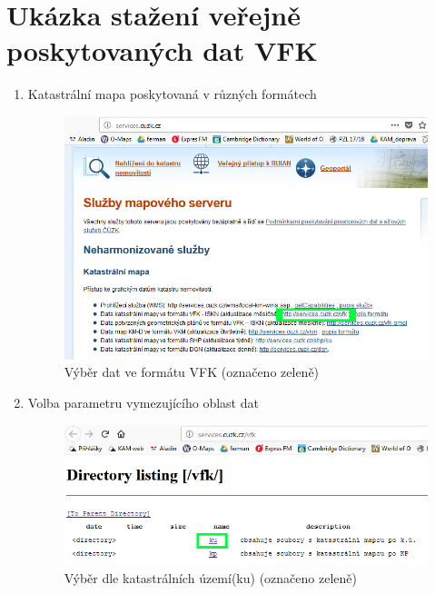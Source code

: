  \section{Ukázka stažení veřejně poskytovaných dat VFK}
 \label{sec:stazeni_dat_ukazka}
  \begin{enumerate}
  \item{Katastrální mapa poskytovaná v různých formátech}
  \begin{figure}[H]
	 \centering
      \includegraphics[width=15cm]{./pictures/stazeni_dat_1kr.png}
      \caption{Výběr dat ve formátu VFK (označeno zeleně)}
      \label{fig:1kr_stazeni}
  \end{figure}
  
  \item{Volba parametru vymezujícího oblast dat}
  \begin{figure}[H]
	 \centering
      \includegraphics[width=15cm]{./pictures/stazeni_dat_2kr.png}
      \caption{Výběr dle katastrálních území(ku) (označeno zeleně)}
      \label{fig:2kr_stazeni}
  \end{figure}
  

\end{enumerate}
